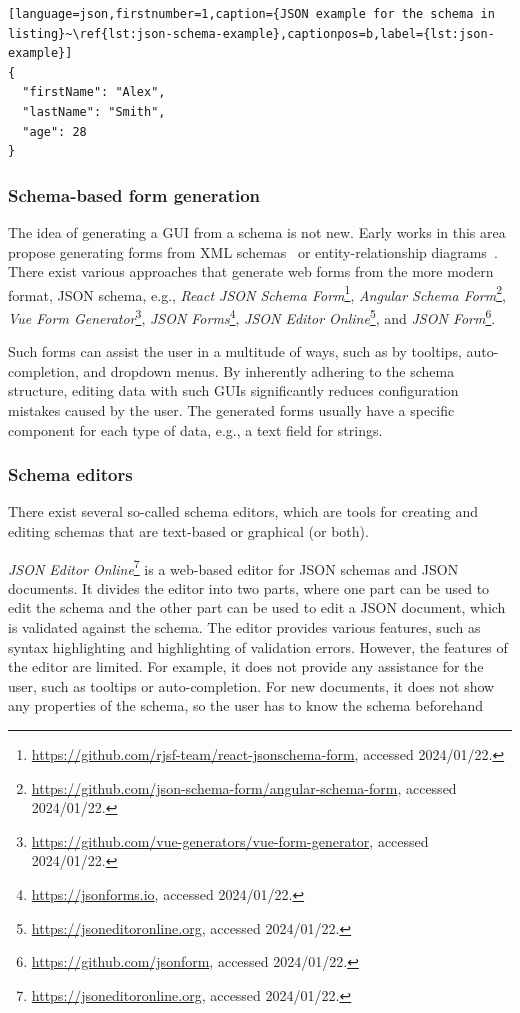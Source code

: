 \begin{lstlisting}[language=json,firstnumber=1,caption={JSON example for the schema in listing}~\ref{lst:json-schema-example},captionpos=b,label={lst:json-example}]
{
  "firstName": "Alex",
  "lastName": "Smith",
  "age": 28
}
\end{lstlisting}



\subsubsection{Schema-based form generation} %

The idea of generating a GUI from a schema is not new.
Early works in this area propose generating forms from XML schemas~\cite{kasarda2010generating, fenech2008semantic,
    kuo2005generating} or entity-relationship diagrams~\cite{bajaj2009user}.
There exist various approaches that generate web forms from the more modern format, JSON schema, e.g.,
\textit{React JSON Schema Form}\footnote{\url{https://github.com/rjsf-team/react-jsonschema-form}, accessed 2024/01/22.},
\textit{Angular Schema Form}\footnote{\url{https://github.com/json-schema-form/angular-schema-form}, accessed 2024/01/22.},
\textit{Vue Form Generator}\footnote{\url{https://github.com/vue-generators/vue-form-generator}, accessed 2024/01/22.},
\textit{JSON Forms}\footnote{\url{https://jsonforms.io}, accessed 2024/01/22.},
\textit{JSON Editor Online}\footnote{\url{https://jsoneditoronline.org}, accessed 2024/01/22.}, and
\textit{JSON Form}\footnote{\url{https://github.com/jsonform}, accessed 2024/01/22.}.

Such forms can assist the user in a multitude of ways, such as by tooltips, auto-completion, and dropdown menus.
By inherently adhering to the schema structure, editing data with such GUIs significantly reduces configuration mistakes caused by the user.
The generated forms usually have a specific component for each type of data, e.g., a text field for strings.




\subsubsection{Schema editors}
There exist several so-called schema editors, which are tools for creating and editing schemas that are text-based or graphical (or both).

\textit{JSON Editor Online}\footnote{\url{https://jsoneditoronline.org}, accessed 2024/01/22.} is a web-based editor for JSON schemas and JSON documents.
It divides the editor into two parts, where one part can be used to edit the schema and the other part can be used to edit a JSON document,
which is validated against the schema.
The editor provides various features, such as syntax highlighting and highlighting of validation errors. 
However, the features of the editor are limited.
For example, it does not provide any assistance for the user, such as tooltips or auto-completion.
For new documents, it does not show any properties of the schema, so the user has to know the schema beforehand

